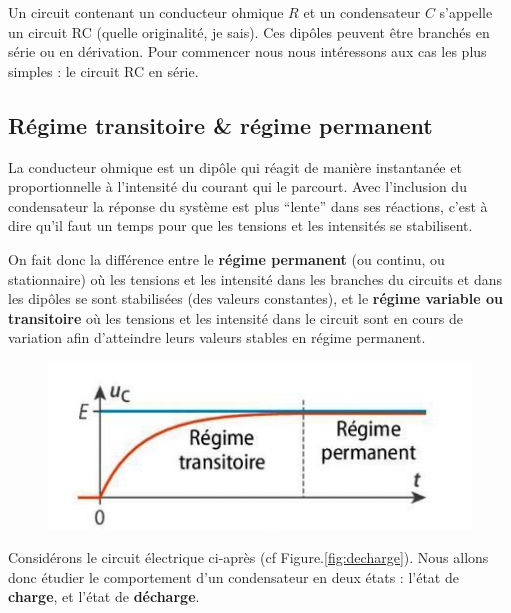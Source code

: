 \documentclass[11pt,a4paper]{article}
\begin{document}
Un circuit contenant un conducteur ohmique $R$ et un condensateur $C$ s'appelle un circuit RC (quelle originalité, je sais). Ces dipôles peuvent être branchés en série ou en dérivation. Pour commencer nous nous intéressons aux cas les plus simples : le circuit RC en série. 

\subsection{Régime transitoire \& régime permanent}
La conducteur ohmique est un dipôle qui réagit de manière instantanée et proportionnelle à l'intensité du courant qui le parcourt. Avec l'inclusion du condensateur la réponse du système est plus ``lente'' dans ses réactions, c'est à dire qu'il faut un temps pour que les tensions et les intensités se stabilisent. 

On fait donc la différence entre le \textbf{régime permanent} (ou continu, ou stationnaire) où les tensions et les intensité dans les branches du circuits et dans les dipôles se sont stabilisées (des valeurs constantes), et le \textbf{régime variable ou transitoire}  où les tensions et les intensité dans le circuit sont en cours de variation afin d'atteindre leurs valeurs stables en régime permanent. 

\begin{figure}[H]
    \centering
    \includegraphics[width=0.8\linewidth]{imgs/p7/regimes.jpg}
\end{figure}

Considérons le circuit électrique ci-après (cf Figure.\ref{fig:decharge}). Nous allons donc étudier le comportement d'un condensateur en deux états : l'état de \textbf{charge}, et l'état de \textbf{décharge}. 
\end{document}
